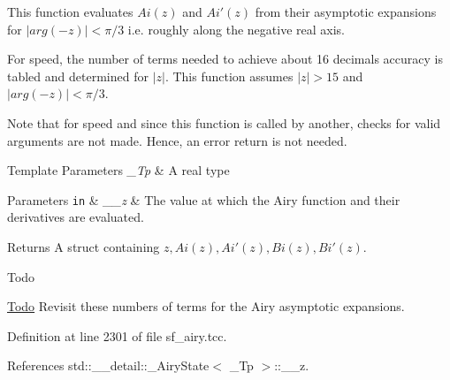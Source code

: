 This function evaluates $ Ai(z) $ and $ Ai'(z) $ from their asymptotic expansions for $ |arg(-z)| < \pi/3 $ i.\+e. roughly along the negative real axis. 

For speed, the number of terms needed to achieve about 16 decimals accuracy is tabled and determined for $ |z| $. This function assumes $ |z| > 15 $ and $ |arg(-z)| < \pi/3 $.

Note that for speed and since this function is called by another, checks for valid arguments are not made. Hence, an error return is not needed.


\begin{DoxyTemplParams}{Template Parameters}
{\em \+\_\+\+Tp} & A real type \\
\hline
\end{DoxyTemplParams}

\begin{DoxyParams}[1]{Parameters}
\mbox{\tt in}  & {\em \+\_\+\+\_\+z} & The value at which the Airy function and their derivatives are evaluated. \\
\hline
\end{DoxyParams}
\begin{DoxyReturn}{Returns}
A struct containing $ z, Ai(z), Ai'(z), Bi(z), Bi'(z) $. 
\end{DoxyReturn}
\begin{DoxyRefDesc}{Todo}
\item[\hyperlink{todo__todo000007}{Todo}]Revisit these numbers of terms for the Airy asymptotic expansions. \end{DoxyRefDesc}


Definition at line 2301 of file sf\+\_\+airy.\+tcc.



References std\+::\+\_\+\+\_\+detail\+::\+\_\+\+Airy\+State$<$ \+\_\+\+Tp $>$\+::\+\_\+\+\_\+z.

\mbox{\label{classstd_1_1____detail_1_1__Airy__asymp_a79ba1c14d03fad8369477baf39c62874}} 
